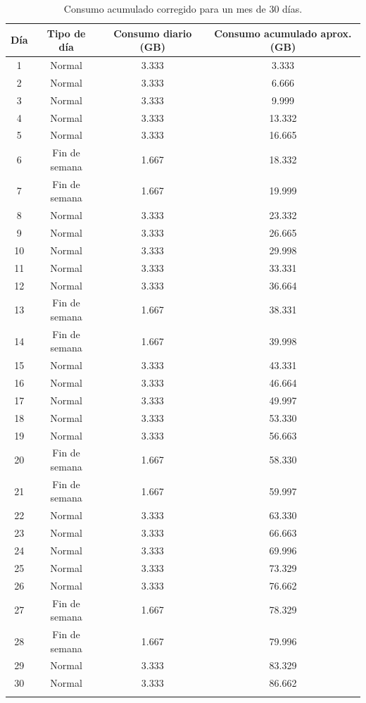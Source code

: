 \documentclass[12pt,a4paper]{article}
\begin{document}
	\begin{longtable}{|c|c|c|c|}
		\hline
		\rowcolor{azulclaro}
		\textbf{Día} & \textbf{Tipo de día} & \textbf{Consumo diario (GB)} & \textbf{Consumo acumulado aprox. (GB)} \\ \hline
		1 & Normal & 3.333 & 3.333 \\ \hline
		2 & Normal & 3.333 & 6.666 \\ \hline
		3 & Normal & 3.333 & 9.999 \\ \hline
		4 & Normal & 3.333 & 13.332 \\ \hline
		5 & Normal & 3.333 & 16.665 \\ \hline
		6 & Fin de semana & 1.667 & 18.332 \\ \hline
		7 & Fin de semana & 1.667 & 19.999 \\ \hline
		8 & Normal & 3.333 & 23.332 \\ \hline
		9 & Normal & 3.333 & 26.665 \\ \hline
		10 & Normal & 3.333 & 29.998 \\ \hline
		11 & Normal & 3.333 & 33.331 \\ \hline
		12 & Normal & 3.333 & 36.664 \\ \hline
		13 & Fin de semana & 1.667 & 38.331 \\ \hline
		14 & Fin de semana & 1.667 & 39.998 \\ \hline
		15 & Normal & 3.333 & 43.331 \\ \hline
		16 & Normal & 3.333 & 46.664 \\ \hline
		17 & Normal & 3.333 & 49.997 \\ \hline
		18 & Normal & 3.333 & 53.330 \\ \hline
		19 & Normal & 3.333 & 56.663 \\ \hline
		20 & Fin de semana & 1.667 & 58.330 \\ \hline
		21 & Fin de semana & 1.667 & 59.997 \\ \hline
		22 & Normal & 3.333 & 63.330 \\ \hline
		23 & Normal & 3.333 & 66.663 \\ \hline
		24 & Normal & 3.333 & 69.996 \\ \hline
		25 & Normal & 3.333 & 73.329 \\ \hline
		26 & Normal & 3.333 & 76.662 \\ \hline
		27 & Fin de semana & 1.667 & 78.329 \\ \hline
		28 & Fin de semana & 1.667 & 79.996 \\ \hline
		29 & Normal & 3.333 & 83.329 \\ \hline
		30 & Normal & 3.333 & 86.662 \\ \hline
		\caption{Consumo acumulado corregido para un mes de 30 días.}
	\end{longtable}
	
\end{document}
